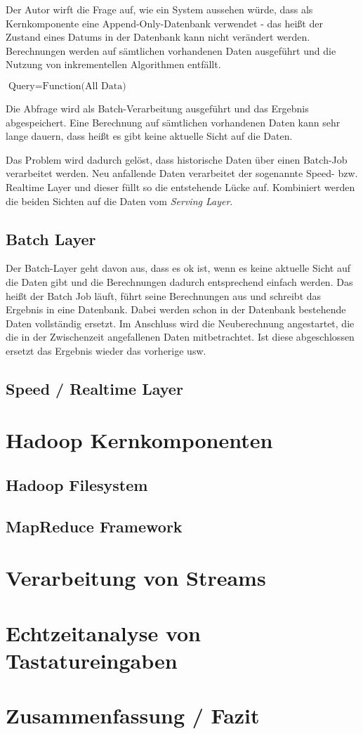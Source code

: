 \documentclass[a4paper,11pt]{scrartcl}
\begin{document}
Der Autor wirft die Frage auf, wie ein System aussehen würde, dass als
Kernkomponente eine Append-Only-Datenbank verwendet - das heißt der Zustand
eines Datums in der Datenbank kann nicht verändert werden. Berechnungen werden
auf sämtlichen vorhandenen Daten ausgeführt und die Nutzung von inkrementellen
Algorithmen entfällt.

$\text{Query} = \text{Function(All Data)}$

Die Abfrage wird als Batch-Verarbeitung ausgeführt und das Ergebnis
abgespeichert. Eine Berechnung auf sämtlichen vorhandenen Daten kann sehr lange
dauern, dass heißt es gibt keine aktuelle Sicht auf die Daten.

Das Problem wird dadurch gelöst, dass historische Daten über einen Batch-Job
verarbeitet werden. Neu anfallende Daten verarbeitet der sogenannte Speed- bzw.
Realtime Layer und dieser füllt so die entstehende Lücke auf. Kombiniert werden
die beiden Sichten auf die Daten vom \textit{Serving Layer}.

\subsection{Batch Layer}
Der Batch-Layer geht davon aus, dass es ok ist, wenn es keine aktuelle Sicht
auf die Daten gibt und die Berechnungen dadurch entsprechend einfach werden.
Das heißt der Batch Job läuft, führt seine Berechnungen aus und schreibt das
Ergebnis in eine Datenbank. Dabei werden schon in der Datenbank bestehende
Daten vollständig ersetzt. Im Anschluss wird die Neuberechnung angestartet, die
die in der Zwischenzeit angefallenen Daten mitbetrachtet. Ist diese
abgeschlossen ersetzt das Ergebnis wieder das vorherige usw.

\subsection{Speed / Realtime Layer}

\section{Hadoop Kernkomponenten}
\subsection{Hadoop Filesystem}
\subsection{MapReduce Framework}

\section{Verarbeitung von Streams}

\section{Echtzeitanalyse von Tastatureingaben}

\section{Zusammenfassung / Fazit}
\end{document}
